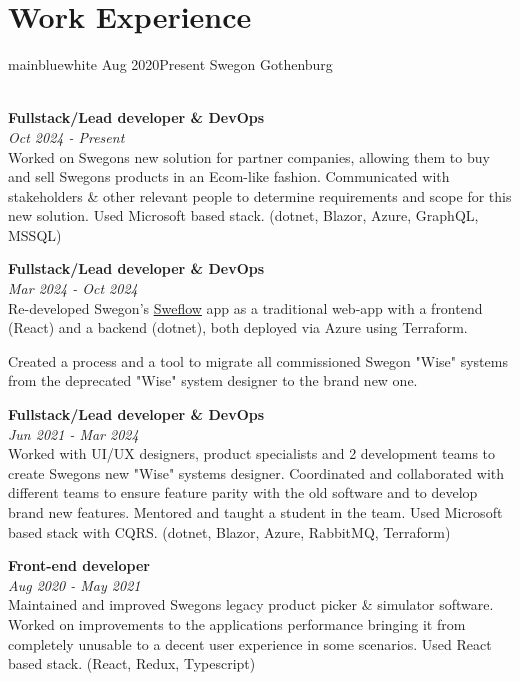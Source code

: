 \documentclass[a4paper]{twentysecondcv} %
\begin{document}
\section{Work Experience}
\begin{twenty} %
    \twentyitemtime
    {mainblue}{white}
    {Aug 2020}{Present}
    {Swegon}
    {Gothenburg}
    {
    \\
    \textbf{Fullstack/Lead developer \& DevOps}
    \\
    \textit{Oct 2024 - Present}
    \\
    Worked on Swegons new solution for partner companies, allowing them to buy and sell Swegons products in an Ecom-like fashion. Communicated with stakeholders \& other relevant people to determine requirements and scope for this new solution. Used Microsoft based stack. (dotnet, Blazor, Azure, GraphQL, MSSQL)

    \vspace{1em}
    
    \textbf{Fullstack/Lead developer \& DevOps}
    \\
    \textit{Mar 2024 - Oct 2024}
    \\
    Re-developed Swegon's \href{https://sweflow.swegon.com/}{Sweflow} app as a traditional web-app with a frontend (React) and a backend (dotnet), both deployed via Azure using Terraform.
    
    Created a process and a tool to migrate all commissioned Swegon "Wise" systems from the deprecated "Wise" system designer to the brand new one.

    \vspace{1em}

    \textbf{Fullstack/Lead developer \& DevOps}
    \\
    \textit{Jun 2021 - Mar 2024}
    \\
    Worked with UI/UX designers, product specialists and 2 development teams to create Swegons new "Wise" systems designer. Coordinated and collaborated with different teams to ensure feature parity with the old software and to develop brand new features. Mentored and taught a student in the team. Used Microsoft based stack with CQRS. (dotnet, Blazor, Azure, RabbitMQ, Terraform)
    
    \vspace{1em}
    
    \textbf{Front-end developer}
    \\
    \textit{Aug 2020 - May 2021}
    \\
    Maintained and improved Swegons legacy product picker \& simulator software.
    Worked on improvements to the applications performance bringing it from completely unusable to a decent user experience in some scenarios.
    Used React based stack. (React, Redux, Typescript)
    }
    

\end{twenty}
\end{document}
